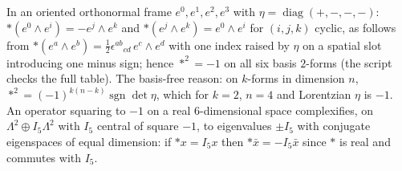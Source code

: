 In an oriented orthonormal frame $e^0, e^1, e^2, e^3$ with $\eta = \operatorname{diag}(+,-,-,-)$: $\ast(e^0\wedge e^i) = -e^j\wedge e^k$ and $\ast(e^j\wedge e^k) = e^0\wedge e^i$ for $(i,j,k)$ cyclic, as follows from $\ast(e^a\wedge e^b) = \tfrac12\epsilon^{ab}{}_{cd}\,e^c\wedge e^d$ with one index raised by $\eta$ on a spatial slot introducing one minus sign; hence $\ast^2 = -1$ on all six basis $2$-forms (the script checks the full table). The basis-free reason: on $k$-forms in dimension $n$, $\ast^2 = (-1)^{k(n-k)}\operatorname{sgn}\det\eta$, which for $k = 2$, $n = 4$ and Lorentzian $\eta$ is $-1$. An operator squaring to $-1$ on a real $6$-dimensional space complexifies, on $\Lambda^2 \oplus I_5\Lambda^2$ with $I_5$ central of square $-1$, to eigenvalues $\pm I_5$ with conjugate eigenspaces of equal dimension: if $\ast x = I_5x$ then $\ast \bar x = -I_5\bar x$ since $\ast$ is real and commutes with $I_5$.
